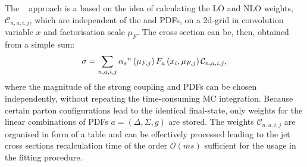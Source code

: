 The \fastnlo~\cite{thesis:wobisch:2001,Kluge:2006,Wobisch:2011,Britzger:2012} approach is a based on the idea of calculating the LO and NLO weights, $\mathcal{C}_{n,a,i,j}$, which are independent of the \as and PDFs, on a 2d-grid in convolution variable $x$ and factorisation scale $\mu_F$. The cross section can be, then, obtained from a simple sum:
\begin{equation}
\sigma = \sum_{n,a,i,j}{ \mbox{$\alpha_{s}$}^n\left( \mu_{F,j} \right) F_a\left( x_i, \mu_{F,j}\right)\mathcal{C}_{n,a,i,j} },
\end{equation}
where the magnitude of the strong coupling and PDFs can be chosen independently, without repeating the time-consuming MC integration. Because certain parton configurations lead to the identical final-state, only weights for the linear combinations of PDFs $a=\left( \Delta, \Sigma, g\right) $ are stored. The weights $\mathcal{C}_{n,a,i,j}$ are organised in form of a table and can be effectively processed leading to the jet cross sections recalculation time of the order $\mathcal{O}\left( ms\right)$ sufficient for the usage in the fitting procedure.

